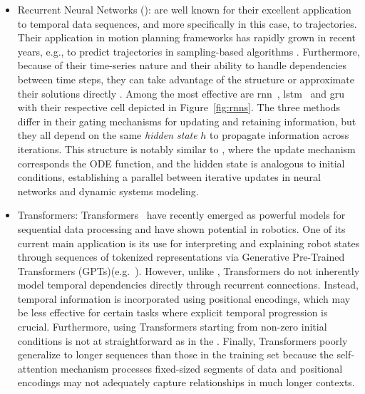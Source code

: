 \begin{itemize}
    \item Recurrent Neural Networks ():  are well known for their excellent application to temporal data sequences, and more specifically in this case, to trajectories.
    Their application in motion planning frameworks has rapidly grown in recent years, e.g., to predict trajectories in sampling-based algorithms \cite{cRNNTraj1,cRNNTraj2}.
    Furthermore, because of their time-series nature and their ability to handle dependencies between time steps, they can take advantage of the  structure \cite{cNODE} or approximate their solutions directly \cite{crnnodes}.
    Among the most effective are \gls{rnn}~\cite{cRNN}, \gls{lstm}~\cite{cLSTM} and \gls{gru}~\cite{cGRU} with their respective cell depicted in Figure~\ref{fig:rnns}.
    The three methods differ in their gating mechanisms for updating and retaining information, but they all depend on the same \emph{hidden state} $h$ to propagate information across iterations.
    This structure is notably similar to , where the update mechanism corresponds the ODE function, and the hidden state is analogous to initial conditions, establishing a parallel between iterative updates in neural networks and dynamic systems modeling.
    \item Transformers: Transformers~\cite{cTrans} have recently emerged as powerful models for sequential data processing and have shown potential in robotics.
    One of its current main application is its use for interpreting and explaining robot states through sequences of tokenized representations via Generative Pre-Trained Transformers (GPTs)(e.g.~\cite{cGPTRobotics}).
    However, unlike , Transformers do not inherently model temporal dependencies directly through recurrent connections. 
    Instead, temporal information is incorporated using positional encodings, which may be less effective for certain tasks where explicit temporal progression is crucial.
    Furthermore, using Transformers starting from non-zero initial conditions is not at straightforward as in the .
    Finally, Transformers poorly generalize to longer sequences than those in the training set because the self-attention mechanism processes fixed-sized segments of data and positional encodings may not adequately capture relationships in much longer contexts.
\end{itemize}

